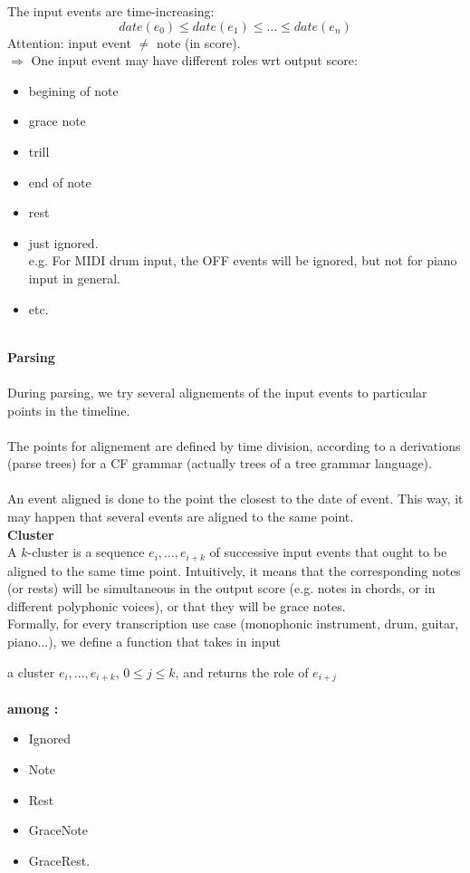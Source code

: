 The input events are time-increasing:
$$ date(e_0) \leq  date(e_1) \leq \ldots \leq date(e_n)$$
Attention: input event $\neq$ note (in score).\\
$\Rightarrow$ One input event may have different roles wrt output score:
\begin{itemize}
	\item begining of note
	\item grace note
	\item trill
	\item end of note
	\item rest
	\item just ignored.\\e.g. For MIDI drum input, the OFF events will be ignored, but not for piano input in general.
	\item etc.\\\\
\end{itemize}

\textbf{Parsing}\\\\
During parsing, we try several alignements of the input events to particular points in the timeline.\\\\
The points for alignement are defined by time division, according to a derivations (parse trees) for a CF grammar (actually trees of a tree grammar language).\\\\
An event aligned is done to the point the closest to the date of event.
This way, it may happen that several events are aligned to the same point.\\

\textbf{Cluster}\\
A $k$-cluster is a sequence $e_i,\ldots, e_{i+k}$ of successive input events that ought to be aligned to the same time point.
Intuitively, it means that the corresponding notes (or rests) will be simultaneous in the output score (e.g. notes in chords, or in different polyphonic voices), or that they will be grace notes.\\
Formally, for every transcription use case (monophonic instrument, drum, guitar, piano...), we define a function that takes in input

a cluster $e_i,\ldots, e_{i+k}$, $0 \leq j \leq k$, and returns the role of $e_{i+j}$\\\\
\textbf{among :}
\begin{itemize}
	\item Ignored
	\item Note
	\item Rest
	\item GraceNote
	\item GraceRest.\\
\end{itemize}

